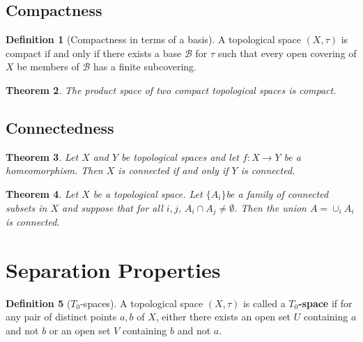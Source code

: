 \documentclass[10pt, oneside, reqno]{amsart}
\theoremstyle{plain}%
\newtheorem{thm}{Theorem}[section]
\theoremstyle{definition}
\newtheorem{defn}[thm]{Definition}
\theoremstyle{remark}
\newcommand{\topo}{(X,\tau)}
\begin{document}
\subsection{Compactness} %
\label{sub:compactness}

\begin{defn}[Compactness in terms of a basis]
	A topological space $\topo$ is compact if and only if there exists a base $\mathcal{B}$ for $\tau$ such that every open covering of $X$ be members of $\mathcal{B}$ has a finite subcovering. 
\end{defn}

\begin{thm}
	The product space of two compact topological spaces is compact.
\end{thm}


\subsection{Connectedness} %
\label{sub:connectedness}

\begin{thm}
	Let $X$ and $Y $ be topological spaces and let $f : X \rightarrow Y$ be a homeomorphism.  Then $X$ is connected if and only if $Y$ is connected.  	
\end{thm}

\begin{thm}
	Let $X$ be a topological space.  Let $\{ A_i \}$be a family of connected subsets in $X$ and suppose that for all $i,j$, $A_i \cap A_j \neq \emptyset$.  Then the union $A = \cup_i A_i$ is connected.
\end{thm}




\section{Separation Properties} %
\label{sec:spearation_properties}

\begin{defn}[$T_0$-spaces]
	A topological space $\topo$ is called a \textbf{$T_0$-space} if for any pair of distinct points $a,b$ of $X$, either there exists an open set $U$ containing $a$ and not $b$ or an open set $V$ containing $b$ and not $a$.
\end{defn}
\end{document}
